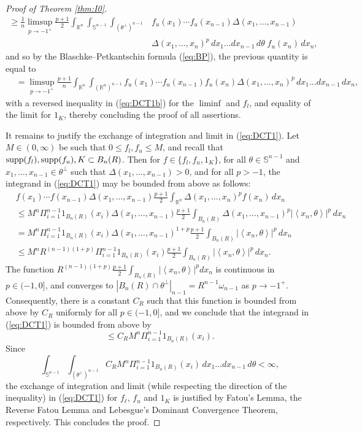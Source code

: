 \documentclass[11pt]{article}
\theoremstyle{definition}
\theoremstyle{proof}
\DeclareMathOperator{\+}{\mathop{\tilde{+}}}
\DeclareMathOperator{\supp}{\textnormal{supp}}
\newcommand{\abs}[1]{\left\vert#1\right\vert}
\newcommand{\scalar}[1]{\left \langle #1 \right \rangle}
\newcommand{\R}{\mathbb{R}}
\renewcommand{\S}{\mathbb{S}}
\numberwithin{equation}{section}
\numberwithin{equation}{section}
\begin{document}
\begin{proof}[Proof of Theorem \ref{thm:I0}]
\begin{align}
\label{eq:DCT1b}  \geq \frac{1}{n}  \limsup_{p \rightarrow -1^+} \frac{p+1}{2} \int_{\R^n} \int_{\S^{n-1}} \int_{(\theta^{\perp})^{n-1}} &  f_u(x_1) \cdots f_u(x_{n-1})   \Delta(x_1,\ldots,x_{n-1}) \\
\nonumber &  \Delta(x_1,\ldots,x_n)^p \, dx_1 \ldots dx_{n-1} \, d\theta \; f_u(x_n) \, dx_n ,
\end{align}
and so by the Blaschke--Petkantschin formula (\ref{eq:BP}),
the previous quantity is equal to
\begin{align*}
& = \limsup_{p \rightarrow -1^+} \frac{p+1}{n} \int_{\R^n} \int_{(\R^n)^{n-1}} f_u(x_1) \cdots f_u(x_{n-1}) f_u(x_n) \Delta(x_1,\ldots,x_n)^p \, dx_1 \ldots dx_{n-1} \, dx_n ,
\end{align*}
with a reversed inequality in (\ref{eq:DCT1b}) for the $\liminf$ and $f_l$, and equality of the limit for $1_K$, thereby concluding the proof of all assertions. 

It remains to justify the exchange of integration and limit in (\ref{eq:DCT1}). Let $M \in (0,\infty)$ be such that $0 \leq f_l,f_u \leq M$, and recall that $\supp(f_l),\supp(f_u), K \subset B_n(R)$. Then for $f \in \{f_l,f_u,1_K\}$, for all $\theta \in \S^{n-1}$ and $x_1,\ldots,x_{n-1} \in \theta^{\perp}$ such that $\Delta(x_1,\ldots,x_{n-1}) > 0$, and for all $p > -1$, the integrand in (\ref{eq:DCT1}) may be bounded from above as follows:
\begin{align*}
& f(x_1) \cdots f(x_{n-1}) \Delta(x_1,\ldots,x_{n-1}) \frac{p+1}{2} \int_{\R^n} \Delta(x_1,\ldots,x_n)^p f(x_n) \, dx_n \\
& \leq M^n \Pi_{i=1}^{n-1} 1_{B_n(R)}(x_i) \Delta(x_1,\ldots,x_{n-1})  \frac{p+1}{2} \int_{B_n(R)} \Delta(x_1,\ldots,x_{n-1})^p \abs{\scalar{x_n,\theta}}^p  \, dx_n \\
& = M^n \Pi_{i=1}^{n-1} 1_{B_n(R)}(x_i) \Delta(x_1,\ldots,x_{n-1})^{1+p}  \frac{p+1}{2} \int_{B_n(R)}  \abs{\scalar{x_n,\theta}}^p  \, dx_n \\
& \leq M^n R^{(n-1)(1+p)} \Pi_{i=1}^{n-1} 1_{B_n(R)}(x_i) \frac{p+1}{2} \int_{B_n(R)}  \abs{\scalar{x_n,\theta}}^p  \, dx_n  . 
\end{align*}
The function $R^{(n-1)(1+p)} \frac{p+1}{2} \int_{B_n(R)}  \abs{\scalar{x_n,\theta}}^p  dx_n$ is continuous in $p \in (-1,0]$, and converges to $|B_n(R) \cap \theta^{\perp}|_{n-1} = R^{n-1} \omega_{n-1}$ as $p \rightarrow -1^+$. Consequently, there is a constant $C_R$ such that this function is bounded from above by $C_R$ uniformly for all $p \in (-1,0]$, and we conclude that the integrand in (\ref{eq:DCT1}) is bounded from above by 
\[
\leq C_R M^n \Pi_{i=1}^{n-1} 1_{B_n(R)}(x_i) . 
\]
Since
\[
\int_{\S^{n-1}} \int_{(\theta^{\perp})^{n-1}} C_R M^n \Pi_{i=1}^{n-1} 1_{B_n(R)}(x_i) \, dx_1 \ldots dx_{n-1} \, d\theta < \infty, \]
the exchange of integration and limit (while respecting the direction of the inequality)  in (\ref{eq:DCT1}) for $f_\ell$, $f_u$ and $1_K$ is justified by Fatou's Lemma, the Reverse Fatou Lemma and Lebesgue's Dominant Convergence Theorem, respectively. This concludes the proof. 
\end{proof}
\end{document}
